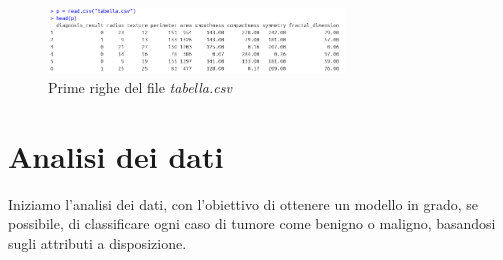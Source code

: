 \documentclass[11pt,a4paper,oneside]{article}
\begin{document}
\begin{figure}[h]
\centering
\includegraphics[width=0.7\textwidth]{images/head}
\caption{Prime righe del file \textit{tabella.csv}}
\label{fig:head}
\end{figure}

\section{Analisi dei dati}
Iniziamo l'analisi dei dati, con l'obiettivo di ottenere un modello in grado, se possibile, di classificare ogni caso di tumore come benigno o maligno, basandosi sugli attributi a disposizione.
\end{document}
